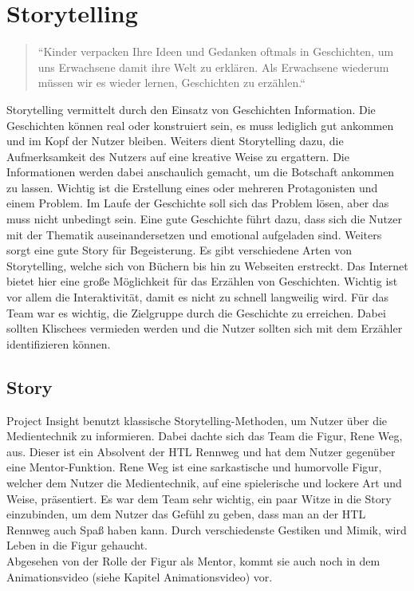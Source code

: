 \section{Storytelling} 
\begin{quote}
“Kinder verpacken Ihre Ideen und Gedanken oftmals in Geschichten, um uns Erwachsene damit ihre Welt zu erklären. Als Erwachsene wiederum müssen wir es wieder lernen, Geschichten zu erzählen.“   \cite{storytellingzitat}
\end{quote}
Storytelling vermittelt durch den Einsatz von Geschichten Information. Die Geschichten können real oder konstruiert sein, es muss lediglich gut ankommen und im Kopf der Nutzer bleiben. Weiters dient Storytelling dazu, die Aufmerksamkeit des Nutzers auf eine kreative Weise zu ergattern. Die Informationen werden dabei anschaulich gemacht, um die Botschaft ankommen zu lassen. Wichtig ist die Erstellung eines oder mehreren Protagonisten und einem Problem. Im Laufe der Geschichte soll sich das Problem lösen, aber das muss nicht unbedingt sein. Eine gute Geschichte führt dazu, dass sich die Nutzer mit der Thematik auseinandersetzen und emotional aufgeladen sind. Weiters sorgt eine gute Story für Begeisterung. Es gibt verschiedene Arten von Storytelling, welche sich von Büchern bis hin zu Webseiten erstreckt. Das Internet bietet hier eine große Möglichkeit für das Erzählen von Geschichten. Wichtig ist vor allem die Interaktivität, damit es nicht zu schnell langweilig wird.  Für das Team war es wichtig, die Zielgruppe durch die Geschichte zu erreichen. Dabei sollten Klischees vermieden werden und die Nutzer sollten sich mit dem Erzähler identifizieren können. \cite{storytelling}
\subsection{Story}
Project Insight benutzt klassische Storytelling-Methoden, um Nutzer über die Medientechnik zu informieren. Dabei dachte sich das Team die Figur, Rene Weg, aus. Dieser ist ein Absolvent der HTL Rennweg und hat dem Nutzer gegenüber eine Mentor-Funktion. Rene Weg ist eine sarkastische und humorvolle Figur, welcher dem Nutzer die Medientechnik, auf eine spielerische und lockere Art und Weise, präsentiert. Es war dem Team sehr wichtig, ein paar Witze in die Story einzubinden, um dem Nutzer das Gefühl zu geben, dass man an der HTL Rennweg auch Spaß haben kann. Durch verschiedenste Gestiken und Mimik, wird Leben in die Figur gehaucht. \leavevmode \\
Abgesehen von der Rolle der Figur als Mentor, kommt sie auch noch in dem Animationsvideo (siehe Kapitel Animationsvideo) vor. 

